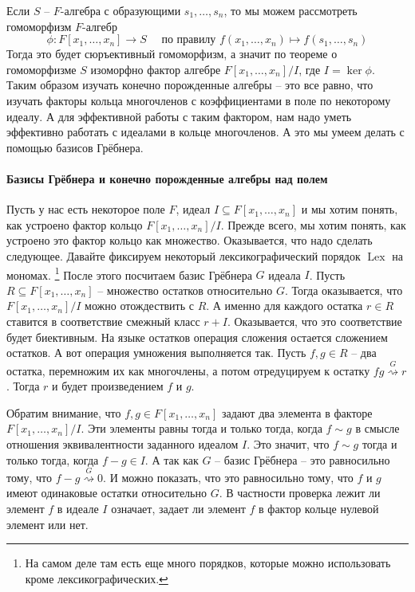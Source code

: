 Если $S$ -- $F$-алгебра с образующими $s_1,\ldots,s_n$, то мы можем рассмотреть гомоморфизм $F$-алгебр
\[
\phi\colon F[x_1,\ldots, x_n]\to S\quad\text{ по правилу }f(x_1,\ldots,x_n) \mapsto f(s_1,\ldots,s_n)
\]
Тогда это будет сюръективный гомоморфизм, а значит по теореме о гомоморфизме $S$ изоморфно фактор алгебре $F[x_1,\ldots, x_n]/I$, где $I = \ker \phi$.
Таким образом изучать конечно порожденные алгебры -- это все равно, что изучать факторы кольца многочленов с коэффициентами в поле по некоторому идеалу.
А для эффективной работы с таким фактором, нам надо уметь эффективно работать с идеалами в кольце многочленов.
А это мы умеем делать с помощью базисов Грёбнера.

\paragraph{Базисы Грёбнера и конечно порожденные алгебры над полем}

Пусть у нас есть некоторое поле $F$, идеал $I\subseteq F[x_1,\ldots,x_n]$ и мы хотим понять, как устроено фактор кольцо $F[x_1,\ldots,x_n]/I$.
Прежде всего, мы хотим понять, как устроено это фактор кольцо как множество.
Оказывается, что надо сделать следующее.
Давайте фиксируем некоторый лексикографический порядок $\operatorname{Lex}$ на мономах.%
\footnote{На самом деле там есть еще много порядков, которые можно использовать кроме лексикографических.}
После этого посчитаем базис Грёбнера $G$ идеала $I$.
Пусть $R\subseteq F[x_1,\ldots,x_n]$ -- множество остатков относительно $G$.
Тогда оказывается, что $F[x_1,\ldots,x_n]/I$ можно отождествить с $R$.
А именно для каждого остатка $r\in R$ ставится в соответствие смежный класс $r+I$.
Оказывается, что это соответствие будет биективным.
На языке остатков операция сложения остается сложением остатков.
А вот операция умножения выполняется так.
Пусть $f,g\in R$ -- два остатка, перемножим их как многочлены, а потом отредуцируем к остатку $fg \stackrel{G}{\rightsquigarrow}r$.
Тогда $r$ и будет произведением $f$ и $g$.

Обратим внимание, что $f,g\in F[x_1,\ldots, x_n]$ задают два элемента в факторе $F[x_1,\ldots,x_n]/I$.
Эти элементы равны тогда и только тогда, когда $f\sim g$ в смысле отношения эквивалентности заданного идеалом $I$.
Это значит, что $f\sim g$ тогда и только тогда, когда $f-g\in I$.
А так как $G$ -- базис Грёбнера -- это равносильно тому, что $f - g \stackrel{G}{\rightsquigarrow}0$.
И можно показать, что это равносильно тому, что $f$ и $g$ имеют одинаковые остатки относительно $G$.
В частности проверка лежит ли элемент $f$ в идеале $I$ означает, задает ли элемент $f$ в фактор кольце нулевой элемент или нет.